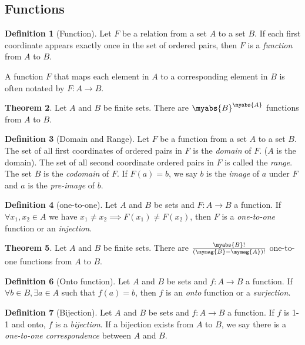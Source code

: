 \documentclass[11pt]{article}
\theoremstyle{definition}
\newtheorem{theorem}{Theorem}[section]
\newtheorem{definition}[theorem]{Definition}
\begin{document}
\subsection{Functions}
\begin{definition}[Function]
Let $F$ be a relation from a set $A$ to a set $B$. If each first coordinate appears exactly once in the set of ordered pairs, then $F$ is a \emph{function} from $A$ to $B$.
\end{definition}
A function $F$ that maps each element in $A$ to a corresponding element in
$B$ is often notated by $F: A \rightarrow B$.
\begin{theorem}
    Let $A$ and $B$ be finite sets. There are $\myabs{B}^{\myabs{A}}$
    functions from $A$ to $B$.
\end{theorem}
\begin{definition}[Domain and Range]
    Let $F$ be a function from a set $A$ to a set $B$. The set of all first
    coordinates of ordered pairs in $F$ is the \emph{domain} of $F$. ($A$
    is the domain). The set of all second coordinate ordered pairs in $F$
    is called the \emph{range}. The set $B$ is the \emph{codomain} of $F$.
    If $F(a) = b$, we say $b$ is the \emph{image} of $a$ under $F$ and $a$
    is the \emph{pre-image} of $b$.
\end{definition}
\begin{definition}[one-to-one]
Let $A$ and $B$ be sets and $F: A \to B$ a function. If $\forall x_1,x_2
\in A$ we have $x_1 \neq x_2 \implies F(x_1) \neq F(x_2)$, then $F$ is a
\emph{one-to-one} function or an \emph{injection}.
\end{definition}
\begin{theorem}
    Let $A$ and $B$ be finite sets. There are
    $\frac{\myabs{B}!}{(\mymag{B}-\mymag{A})!}$ one-to-one functions from
    $A$ to $B$.
\end{theorem}
\begin{definition}[Onto function]
Let $A$ and $B$ be sets and $f: A \to B$ a function. If $\forall b \in B,
\exists a\in A$ such that $f(a) = b$, then $f$ is an \emph{onto} function
or a \emph{surjection}.
\end{definition}
\begin{definition}[Bijection]
Let $A$ and $B$ be sets and $f: A \to B$ a function. If $f$ is 1-1 and
onto, $f$ is a \emph{bijection}. If a bijection exists from $A$ to $B$, we
say there is a \emph{one-to-one correspondence} between $A$ and $B$.
\end{definition}
\end{document}
